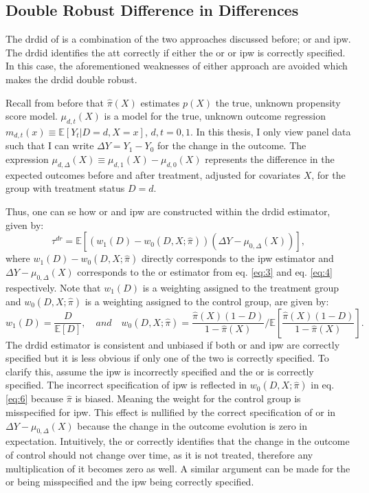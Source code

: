 \subsection{Double Robust Difference in Differences}

The \ac{drdid} of \citet{santannaDoublyRobustDifferenceindifferences2020} is a combination of the two approaches discussed before; \ac{or} and \ac{ipw}.
The \ac{drdid} identifies the \ac{att} correctly if either the \ac{or} or \ac{ipw} is correctly specified.
In this case, the aforementioned weaknesses of either approach are avoided which makes the \ac{drdid} double robust.

Recall from before that $\hat{\pi}(X)$ estimates $p(X)$ the true, unknown propensity score model. $\mu_{d,t}(X)$ is a model for the true, unknown outcome regression $m_{d,t}(x)\equiv \mathbb{E}[Y_t | D = d, X = x]$, $d, t = 0, 1$.
In this thesis, I only view panel data such that I can write $\Delta Y = Y_1 - Y_0$ for the change in the outcome.
The expression $\mu_{d,\Delta}(X) \equiv \mu_{d,1}(X) - \mu_{d,0}(X)$ represents the difference in the expected outcomes before and after treatment, adjusted for covariates $X$, for the group with treatment status $D=d$.

Thus, one can se how \ac{or} and \ac{ipw} are constructed within the \ac{drdid} estimator, given by:
\begin{equation}
\tau^{dr} = \mathbb{E} \left[ \left( w_1(D) - w_0(D, X; \hat{\pi}) \right) \left( \Delta Y - \mu_{0, \Delta}(X) \right) \right],
\label{eq:5}
\end{equation}
where $w_1(D) - w_0(D, X; \hat{\pi})$ directly corresponds to the \ac{ipw} estimator and $\Delta Y - \mu_{0, \Delta}(X)$ corresponds to the \ac{or} estimator from eq. \ref{eq:3} and eq. \ref{eq:4} respectively.
Note that $w_1(D)$ is a weighting assigned to the treatment group and $w_0(D, X; \hat{\pi})$ is a weighting assigned to the control group, are given by:
\begin{equation}
w_1(D) = \frac{D}{\mathbb{E}[D]}, \quad  \mathit{and} \quad
w_0(D, X; \hat{\pi}) = \frac{\hat{\pi}(X)(1-D)}{1 - \hat{\pi}(X)} \Bigg/ \mathbb{E} \left[ \frac{\hat{\pi}(X)(1-D)}{1 - \hat{\pi}(X)} \right].
\label{eq:6}
\end{equation}
The \ac{drdid} estimator is consistent and unbiased if both \ac{or} and \ac{ipw} are correctly specified but it is less obvious if only one of the two is correctly specified.
To clarify this, assume the \ac{ipw} is incorrectly specified and the \ac{or} is correctly specified.
The incorrect specification of \ac{ipw} is reflected in $w_0(D, X; \hat{\pi})$ in eq. \ref{eq:6} because $\hat{\pi}$ is biased.
Meaning the weight for the control group is misspecified for \ac{ipw}.
This effect is nullified by the correct specification of \ac{or} in $\Delta Y - \mu_{0, \Delta}(X)$ because the change in the outcome evolution is zero in expectation.
Intuitively, the \ac{or} correctly identifies that the change in the outcome of control should not change over time, as it is not treated, therefore any multiplication of it becomes zero as well.
A similar argument can be made for the \ac{or} being misspecified and the \ac{ipw} being correctly specified.
